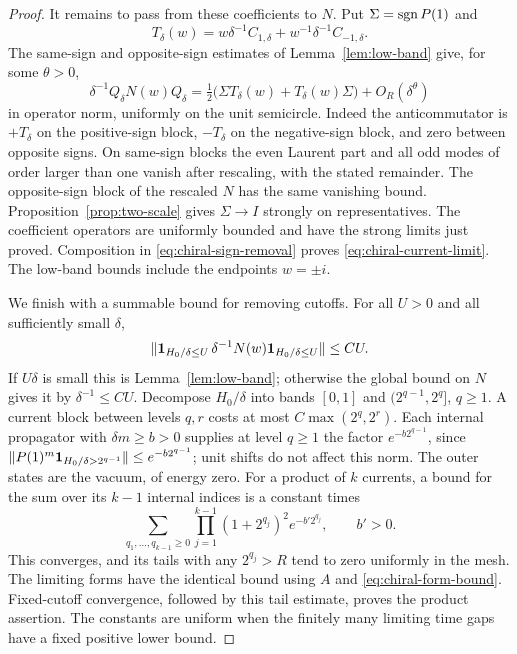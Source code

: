 \begin{proof}
It remains to pass from these coefficients to $N$. Put
$\Sigma=\operatorname{sgn} P(1)$ and
\[
 T_\delta(w)=w\delta^{-1}C_{1,\delta}
                         +w^{-1}\delta^{-1}C_{-1,\delta}.
\]
The same-sign and opposite-sign estimates of Lemma~\ref{lem:low-band}
give, for some $\theta>0$,
\begin{equation}\label{eq:chiral-sign-removal}
 \delta^{-1}Q_\delta N(w)Q_\delta
       =\tfrac12\bigl(\Sigma T_\delta(w)+T_\delta(w)\Sigma\bigr)
                       +O_R(\delta^\theta)
\end{equation}
in operator norm, uniformly on the unit semicircle. Indeed the
anticommutator is $+T_\delta$ on the positive-sign block,
$-T_\delta$ on the negative-sign block, and zero between opposite signs.
On same-sign blocks the even Laurent part and all odd modes of order
larger than one vanish after rescaling, with the stated remainder.
The opposite-sign block of the rescaled $N$ has the same vanishing bound.
Proposition~\ref{prop:two-scale} gives $\Sigma\to I$ strongly on
representatives. The coefficient operators are uniformly bounded and have
the strong limits just proved. Composition in
\eqref{eq:chiral-sign-removal} proves \eqref{eq:chiral-current-limit}.
The low-band bounds include the endpoints $w=\pm i$.

We finish with a summable bound for removing cutoffs. For all $U>0$ and
all sufficiently small $\delta$,
\begin{equation}\label{eq:chiral-all-band-bound}
 \|\mathbf1_{H_0/\delta\le U}\,\delta^{-1}N(w)
                      \mathbf1_{H_0/\delta\le U}\|\le CU.
\end{equation}
If $U\delta$ is small this is Lemma~\ref{lem:low-band}; otherwise the
global bound on $N$ gives it by $\delta^{-1}\le C U$.
Decompose $H_0/\delta$ into bands $[0,1]$ and
$(2^{q-1},2^q]$, $q\ge1$. A current block between levels $q,r$ costs
at most $C\max(2^q,2^r)$. Each internal propagator with
$\delta m\ge b>0$ supplies at level $q\ge1$ the factor
$e^{-b2^{q-1}}$, since
$\|P(1)^m\mathbf1_{H_0/\delta>2^{q-1}}\|\le e^{-b2^{q-1}}$;
unit shifts do not affect this norm.
The outer states are the vacuum, of energy zero. For a product of $k$
currents, a bound for the sum over its $k-1$ internal indices is a constant
times
\begin{equation}\label{eq:chiral-dyadic-majorant}
 \sum_{q_1,\ldots,q_{k-1}\ge0}
       \prod_{j=1}^{k-1}(1+2^{q_j})^2e^{-b'2^{q_j}},
                         \qquad b'>0.
\end{equation}
This converges, and its tails with any $2^{q_j}>R$ tend to zero uniformly
in the mesh. The limiting forms have the identical bound using $A$ and
\eqref{eq:chiral-form-bound}. Fixed-cutoff convergence, followed by this
tail estimate, proves the product assertion. The constants are uniform
when the finitely many limiting time gaps have a fixed positive lower
bound.
\end{proof}

